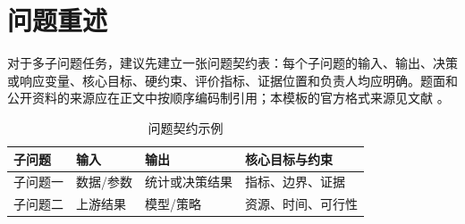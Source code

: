 \section{问题重述}


对于多子问题任务，建议先建立一张问题契约表：每个子问题的输入、输出、决策或响应变量、核心目标、硬约束、评价指标、证据位置和负责人均应明确。题面和公开资料的来源应在正文中按顺序编码制引用；本模板的官方格式来源见文献 \cite{cmathc2025format,cmathc2025notice}。

\begin{table}[H]
  \centering
  \caption{问题契约示例}
  \label{tab:problem-contract}
  \begin{tabular}{p{}p{}p{}p{}}
    \toprule
    子问题 & 输入 & 输出 & 核心目标与约束 \\
    \midrule
    子问题一 & 数据/参数 & 统计或决策结果 & 指标、边界、证据 \\
    子问题二 & 上游结果 & 模型/策略 & 资源、时间、可行性 \\
    \bottomrule
  \end{tabular}
\end{table}
